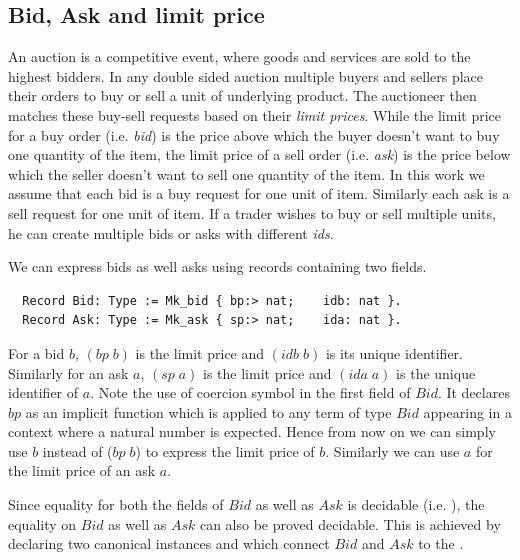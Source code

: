 \documentclass[a4paper,UKenglish,cleveref, autoref]{lipics-v2019}
\begin{document}
\subsection{Bid, Ask and limit price}
An auction is a  competitive event, where goods and services are sold to the highest bidders. In  any double sided auction multiple buyers and sellers place their orders to buy or sell a unit of underlying product. The  auctioneer then matches these buy-sell requests  based on their \emph{limit prices}. While the limit price for a buy order (i.e. \emph{bid}) is the price above which the buyer doesn't want to buy one quantity of the item, the limit price of a sell order (i.e. \emph{ask}) is the price below which the seller doesn't want to sell one quantity of the item.  In this work we assume that each bid is a buy request for one unit of item. Similarly each ask is a sell request for one unit of item. If a trader wishes to buy or sell multiple units, he can create multiple bids or asks with different \emph{ids}. 

We can express bids as well asks using  records containing two fields. 
\begin{verbatim}
  Record Bid: Type := Mk_bid { bp:> nat;    idb: nat }.
  Record Ask: Type := Mk_ask { sp:> nat;    ida: nat }.
\end{verbatim}
For a bid $b$, $(bp \; b)$  is the limit price and $(idb \; b)$ is its unique identifier. Similarly for an ask $a$, $(sp \; a)$ is the limit price and $(ida \; a)$ is the unique identifier of $a$. Note the use of coercion symbol \tw{ :>} in the first field of $Bid$. It declares $bp$ as an implicit function which is applied  to any term of type $Bid$ appearing in a context where a natural number is expected. Hence from now on we can simply use $b$ instead of  ($bp \;b$) to express the limit price of $b$. Similarly we can use $a$ for the limit price of an ask $a$.


Since equality for both the fields of $Bid$ as well as $Ask$ is decidable (i.e. ), the equality on $Bid$ as well as $Ask$ can also be proved decidable. This is achieved by declaring two canonical instances  and  which connect $Bid$ and $Ask$ to the .  
\end{document}
